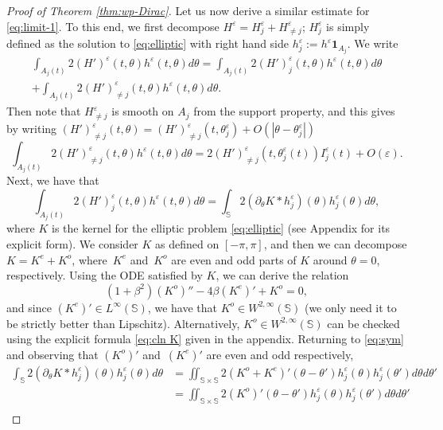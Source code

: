 \documentclass[JEP,XML,SOM,Unicode,NoFloatCountersInSection,published]{cedram}
\theoremstyle{plain}
\theoremstyle{definition}
\let\rd\partial
\let\bt\beta
\let\tht\theta
\let\varep\varepsilon
\newcommand{\bbS}{\mathbb S}
\begin{document}
\begin{proof}[Proof of Theorem \ref{thm:wp-Dirac}]
Let us now derive a similar estimate for \eqref{eq:limit-1}. To this end, we first decompose $H^\varep = H^\varep_j + H^\varep_{\ne j}$; $H^{\varep}_j$ is simply defined as the solution to \eqref{eq:elliptic} with right hand side $h^\varep_j := h^\varep \mathbf{1}_{A_{j}}$. We write
\begin{multline*}
\int_{A_{j}(t)} 2 (H')^\varep(t,\tht) h^\varep(t,\tht) d\tht = \int_{A_{j}(t)} 2 (H')^\varep_{j}(t,\tht) h^\varep(t,\tht) d\tht\\
+\int_{A_{j}(t)} 2 (H')^\varep_{\ne j}(t,\tht) h^\varep(t,\tht) d\tht.
\end{multline*}
Then note that $H^\varep_{\ne j}$ is smooth on $A_{j}$ from the support property, and this gives by writing $(H')^\varep_{\ne j}(t,\tht) = (H')^\varep_{\ne j}(t,\tht_j^\varep) + O(|\tht - \tht_j^\varep|)$
\begin{equation*}
\int_{A_{j}(t)} 2 (H')^\varep_{\ne j}(t,\tht) h^\varep(t,\tht) d\tht = 2 (H')^\varep_{\ne j}(t,\tht^\varep_j(t)) I^{\varep}_j(t) + O(\varep).
\end{equation*}
Next, we have that
\begin{equation}\label{eq:sym}
\int_{A_{j}(t)} 2 (H')^\varep_{j}(t,\tht) h^\varep(t,\tht) d\tht = \int_{\bbS} 2 (\rd_\tht K*h^\varep_j) (\tht) h^\varep_j(\tht) d\tht,
\end{equation}
where $K$ is the kernel for the elliptic problem \eqref{eq:elliptic} (see Appendix for its explicit form). We consider $K$ as defined on $[-\pi,\pi]$, and then we can decompose $K= K^e + K^o$, where~$K^e$ and~$K^o$ are even and odd parts of $K$ around $\tht = 0$, respectively. Using the ODE satisfied by $K$, we can derive the relation
\begin{equation*}
(1+\bt^2) (K^o)'' - 4\bt (K^e)' + K^o = 0,
\end{equation*}
and since $(K^e)' \in L^\infty(\bbS)$, we have that $K^o \in W^{2,\infty}(\bbS)$ (we only need it to be strictly better than Lipschitz). Alternatively, $K^o \in W^{2,\infty}(\bbS)$ can be checked using the explicit formula \eqref{eq:cln K} given in the appendix. Returning to \eqref{eq:sym} and observing that $(K^o)'$ and~$(K^e)'$ are even and odd respectively,
\begin{equation*}
\begin{split}
\int_{\bbS} 2 (\rd_\tht K*h^\varep_j) (\tht) h^\varep_j(\tht) d\tht & = \iint_{\bbS\times\bbS} 2 (K^o + K^e)'(\tht-\tht') h^\varep_j (\tht) h^\varep_j (\tht') d\tht d\tht' \\
& = \iint_{\bbS\times\bbS} 2 (K^o)'(\tht-\tht') h^\varep_j (\tht) h^\varep_j (\tht') d\tht d\tht' \\

\end{split}
\end{equation*}
\end{proof}
\end{document}
